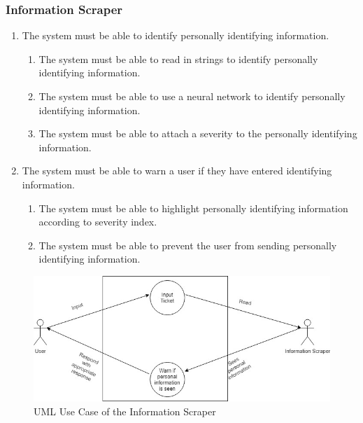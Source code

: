 \documentclass[11pt]{article}
\begin{document}
\subsubsection{Information Scraper}
\begin{enumerate}[label=R2.\arabic*.]
	\item The system must be able to identify personally identifying information.
	\begin{enumerate}[label*=\arabic*.]
		\item The system must be able to read in strings to identify personally identifying information.
		\item The system must be able to use a neural network to identify personally identifying information.
		\item The system must be able to attach a severity to the personally identifying information.
	\end{enumerate}
	\item The system must be able to warn a user if they have entered identifying information.
	\begin{enumerate}[label*=\arabic*.]
		\item The system must be able to highlight personally identifying information according to severity index.
		\item The system must be able to prevent the user from sending personally identifying information.
	\end{enumerate}
\end{enumerate}

\begin{figure}[H]
	\centering
	\includegraphics[width=1.0\textwidth]{../../images/Information_Scraper_UCD.jpg}
	\caption{UML Use Case of the Information Scraper}
\end{figure}
\end{document}
